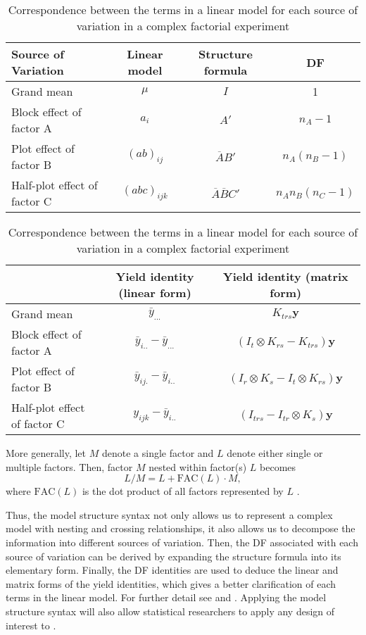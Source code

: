 \documentclass[article]{jss}
\begin{document}
\begin{table}[ht]
\centering
\caption{Correspondence between the terms in a linear model for each source of variation in a complex factorial experiment}
\begin{tabular}[t]{lccc}
\hline
\multicolumn{1}{l}{Source of Variation} & \multicolumn{1}{c}{Linear model} & \multicolumn{1}{c}{Structure formula}  & \multicolumn{1}{c}{DF}\\
\hline
Grand mean 					& $\mu$ & $I$	 & 1 \\
Block effect of factor A 	& $a_i$ & $A'$	 	& $n_A - 1$ \\
Plot effect of factor B 	& $(ab)_{ij}$ & $\overline{A}B'$	 	& $n_A (n_B - 1)$ \\
Half-plot effect of factor C 	& $(abc)_{ijk}$ & $\overline{A}\overline{B}C'$	 	& $n_A n_B (n_C-1)$ \\
\hline
\end{tabular}
\begin{tabular}[t]{lcc}
\multicolumn{1}{l}{} & \multicolumn{1}{c}{Yield identity (linear form)}& \multicolumn{1}{c}{Yield identity (matrix form)}\\
\hline
Grand mean 					&$\bar{y}_{...}$ 			&$K_{trs}\bm{y}$\\
Block effect of factor A    &$\bar{y}_{i..} - \bar{y}_{...}$ & $(I_{t} \otimes K_{rs} - K_{trs})\bm{y}$\\
Plot effect of factor B 	& $\bar{y}_{ij.} - \bar{y}_{i..}$ & $(I_{r}\otimes K_{s} - I_{t} \otimes K_{rs})\bm{y}$\\
Half-plot effect of factor C  & $y_{ijk} - \bar{y}_{i..}$ & $(I_{trs} - I_{tr}\otimes K_{s})\bm{y}$\\
\hline
\end{tabular}
\label{tab:expandComplexNest}
\end{table}

More generally, let $M$ denote a single factor and $L$ denote either single or multiple factors. Then, factor $M$ nested within factor(s) $L$ becomes
\[
L/M = L + \mathrm{FAC}(L) \cdot M,
\]
where $\mathrm{FAC}(L)$ is the dot product of all factors represented by $L$ \citep{Wilkinson1973}.

Thus, the model structure syntax not only allows us to represent a complex model with nesting and crossing relationships, it also allows us to decompose the information into different sources of variation. Then, the DF associated with each source of variation can be derived by expanding the structure formula into its elementary form. Finally, the DF identities are used to deduce the linear and matrix forms of the yield identities, which gives a better clarification of each terms in the linear model. For further detail see \cite{Wilkinson1973} and \cite{Nelder1965A}. Applying the model structure syntax will also allow statistical researchers to apply any design of interest to .
\end{document}
